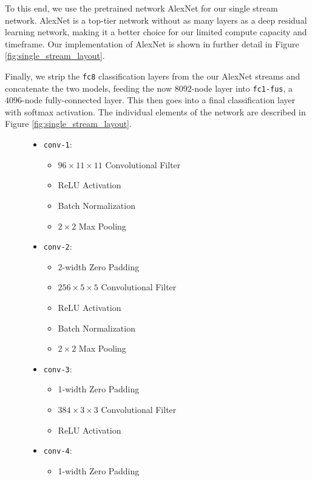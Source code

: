 To this end, we use the pretrained network AlexNet for our single stream network. AlexNet is a top-tier network without as many layers as a deep residual learning network, making it a better choice for our limited compute capacity and timeframe. Our implementation of AlexNet is shown in further detail in Figure \ref{fig:single_stream_layout}. 

Finally, we strip the \texttt{fc8} classification layers from the our AlexNet streams and concatenate the two models, feeding the now 8092-node layer into \texttt{fc1-fus}, a 4096-node fully-connected layer. This then goes into a final classification layer with softmax activation. The individual elements of the network are described in Figure \ref{fig:single_stream_layout}.

\begin{figure}
	\begin{mdframed}
		\begin{itemize}
			\item \texttt{conv-1}:
			\begin{itemize}
				\item $96 \times 11 \times 11$ Convolutional Filter
				\item ReLU Activation
				\item Batch Normalization
				\item $2 \times 2$ Max Pooling
			\end{itemize}
			\item \texttt{conv-2}:
			\begin{itemize}
				\item 2-width Zero Padding
				\item $256 \times 5 \times 5$ Convolutional Filter
				\item ReLU Activation
				\item Batch Normalization
				\item $2 \times 2$ Max Pooling
			\end{itemize}
			\item \texttt{conv-3}:
			\begin{itemize}
				\item 1-width Zero Padding
				\item $384 \times 3 \times 3$ Convolutional Filter
				\item ReLU Activation
			\end{itemize}
			\item \texttt{conv-4}:
			\begin{itemize}
				\item 1-width Zero Padding

\end{itemize}
\end{itemize}
\end{mdframed}
\end{figure}

